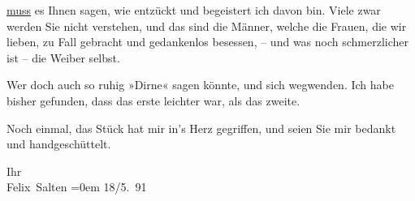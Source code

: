                   \uline{muss} es Ihnen sagen, wie entzückt und begeistert
               ich davon bin. Viele zwar werden Sie nicht verstehen, und das sind die Männer, welche
               die Frauen, die wir lieben, zu Fall gebracht und gedankenlos besessen, – und was noch
               schmerzlicher ist – die Weiber selbst.\pend
           
\pstart
           Wer doch auch so ruhig »Dirne« sagen könnte, und sich wegwenden. Ich habe bisher
               gefunden, dass das erste {\pb}leichter war, als das zweite.\pend
           
\pstart
           Noch einmal, das Stück hat mir
               in’s Herz gegriffen, und seien Sie mir bedankt und handgeschüttelt.\pend
           
\pstart
           Ihr{\\[\baselineskip]}\spacefill\mbox{Felix Salten}\pend
           \leftskip=0em{}
\pstart
           \raggedleft{}18/5. 91\pend
           \endnumbering{}  \newcommand{\dateiname}{L03101}\newcommand{\titel}{Felix Salten an Arthur Schnitzler, 18. 5. 1891}\newcommand{\editorInnen}{Martin Anton Müller und Laura Untner}
